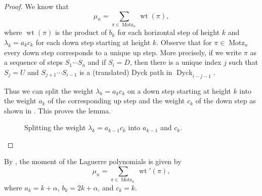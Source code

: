 \documentclass[oneside]{book}
\numberwithin{equation}{section}
\theoremstyle{definition}
\newcommand\Motz{\operatorname{Motz}}
\newcommand{\Dyck}{\operatorname{Dyck}}
\newcommand\wt{\operatorname{wt}}
\begin{document}
\begin{proof}
  We know that
  \[
    \mu_n = \sum_{\pi\in \Motz_n} \wt(\pi),
  \]
  where \( \wt(\pi) \) is the product of \( b_k \) for each horizontal
  step of height \( k \) and \( \lambda_k = a_kc_k \) for each down
  step starting at height \( k \). Observe that for
  \( \pi\in \Motz_n \) every down step corresponds to a unique up
  step. More precisely, if we write \( \pi \) as a sequence of steps
  \( S_1 \cdots S_n \) and if \( S_i = D \), then there is a unique
  index \( j \) such that \( S_j=U \) and \( S_{j+1}\cdots S_{i-1} \)
  is a (translated) Dyck path in \( \Dyck_{i-j-1} \).

Thus we can split the weight \( \lambda_k=a_kc_k \) on a down
  step starting at height \( k \) into the weight \( a_k \) of the
  corresponding up step and the weight \( c_k \) of the down step as
  shown in . This proves the lemma.
  \begin{figure}
    \centering
\caption{Splitting the weight \( \lambda_k=a_{k-1}c_k \)
  into \( a_{k-1} \) and \( c_k \).}
    \label{fig:up-down}
  \end{figure}
\end{proof}

By , the moment of the Laguerre polynomials is given by
\begin{equation}\label{eq:26}
    \mu_n = \sum_{\pi\in \Motz_n} \wt'(\pi),
\end{equation}
where \( a_k = k+\alpha \), \( b_k = 2k+\alpha \), and
\( c_k = k \).
\end{document}
